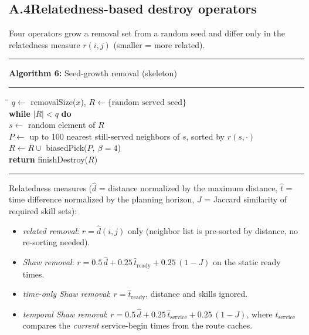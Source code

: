 \documentclass[10pt, a4paper]{article}
\begin{document}
\subsection*{A.4\quad Relatedness-based destroy operators}

Four operators grow a removal set from a random seed and differ only in
the relatedness measure $r(i,j)$ (smaller = more related).

\begin{center}
\begin{minipage}{0.92\linewidth}
\small
\hrule\vspace{2pt}
\textbf{Algorithm 6:} Seed-growth removal (skeleton)
\vspace{2pt}\hrule\vspace{4pt}
\begin{tabbing}
\hspace{1.2em}\=\hspace{1.2em}\=\kill
$q \leftarrow$ removalSize($x$),\quad
$R \leftarrow \{\text{random served seed}\}$\\
\textbf{while} $|R| < q$ \textbf{do}\\
\>$s \leftarrow$ random element of $R$\\
\>$P \leftarrow$ up to 100 nearest still-served neighbors of $s$, sorted
  by $r(s, \cdot)$\\
\>$R \leftarrow R \cup{}$ biasedPick($P,\ \beta{=}4$)\\
\textbf{return} finishDestroy($R$)
\end{tabbing}
\vspace{2pt}\hrule
\end{minipage}
\end{center}

\noindent Relatedness measures ($\hat d$ = distance normalized by the
maximum distance, $\hat t$ = time difference normalized by the planning
horizon, $J$ = Jaccard similarity of required skill sets):
\begin{itemize}\itemsep1pt
\item \emph{related removal}: $r = \hat d(i,j)$ only (neighbor list is
  pre-sorted by distance, no re-sorting needed).
\item \emph{Shaw removal}: $r = 0.5\,\hat d + 0.25\,\hat t_{\text{ready}}
  + 0.25\,(1 - J)$ on the static ready times.
\item \emph{time-only Shaw removal}: $r = \hat t_{\text{ready}}$, distance
  and skills ignored.
\item \emph{temporal Shaw removal}: $r = 0.5\,\hat d +
  0.25\,\hat t_{\text{service}} + 0.25\,(1 - J)$, where
  $\hat t_{\text{service}}$ compares the \emph{current} service-begin
  times from the route caches.
\end{itemize}
\end{document}
